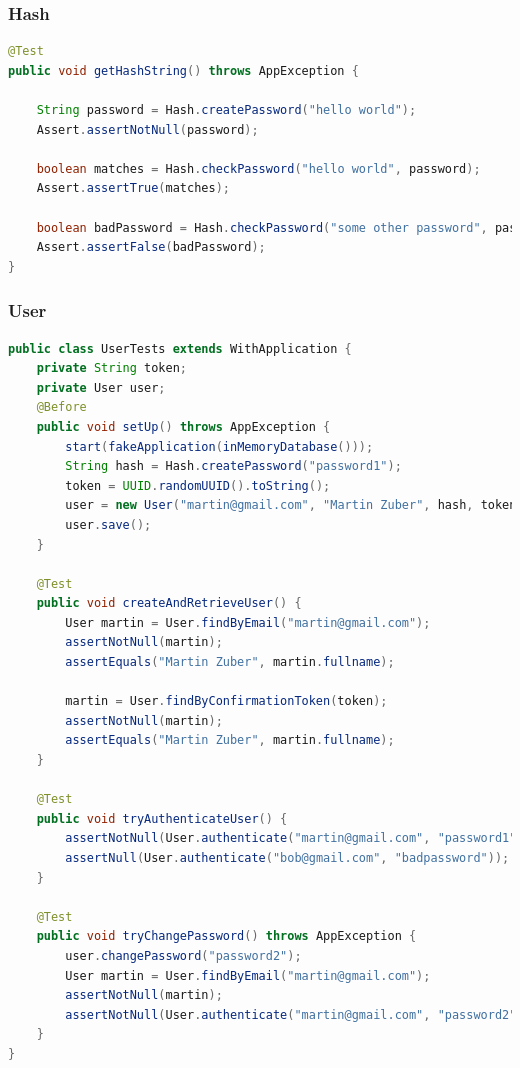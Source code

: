 \documentclass[12pt,twoside,a4paper]{report}
\begin{document}
\subsubsection{Hash}\label{5.2.1.1}
\begin{lstlisting}[language=java]
@Test
public void getHashString() throws AppException {
        
    String password = Hash.createPassword("hello world");
    Assert.assertNotNull(password);

    boolean matches = Hash.checkPassword("hello world", password);
    Assert.assertTrue(matches);

    boolean badPassword = Hash.checkPassword("some other password", password);
    Assert.assertFalse(badPassword);
}
\end{lstlisting}

\subsubsection{User}\label{5.2.1.2}

\begin{lstlisting}[language=java]
public class UserTests extends WithApplication {
	private String token;
	private User user;
    @Before
    public void setUp() throws AppException {
        start(fakeApplication(inMemoryDatabase()));
        String hash = Hash.createPassword("password1");
    	token = UUID.randomUUID().toString();
    	user = new User("martin@gmail.com", "Martin Zuber", hash, token);
    	user.save();
    }
    
    @Test
    public void createAndRetrieveUser() {
    	User martin = User.findByEmail("martin@gmail.com");
        assertNotNull(martin);
        assertEquals("Martin Zuber", martin.fullname);
        
        martin = User.findByConfirmationToken(token);
        assertNotNull(martin);
        assertEquals("Martin Zuber", martin.fullname);
    }
    
    @Test
    public void tryAuthenticateUser() {
       	assertNotNull(User.authenticate("martin@gmail.com", "password1"));
        assertNull(User.authenticate("bob@gmail.com", "badpassword"));
    }
    
    @Test
    public void tryChangePassword() throws AppException {
    	user.changePassword("password2");
    	User martin = User.findByEmail("martin@gmail.com");
    	assertNotNull(martin);
    	assertNotNull(User.authenticate("martin@gmail.com", "password2"));
    }
}
\end{lstlisting}
\end{document}
